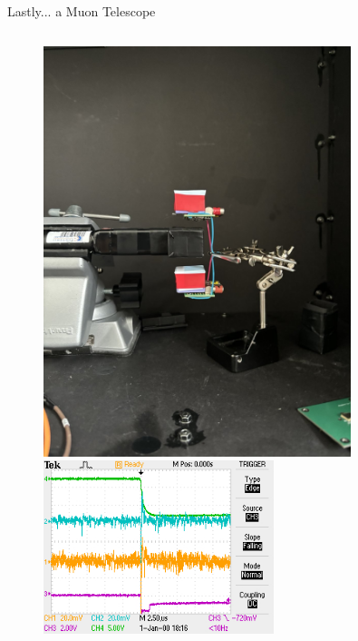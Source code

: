 \begin{columnframe}{Lastly... a Muon Telescope}
    \begin{column}{0.5\textwidth}
        \begin{figure}
            \centering
            \includegraphics[trim=0 500 0 500, clip, width=0.8\textwidth, frame]{images/muon_telescope_setup.jpg}
            \includegraphics[width=0.6\textwidth, frame]{images/muon_coincidence_screenshot.jpg}
        \end{figure}
    \end{column}
    \begin{column}{0.5\textwidth}
        \begin{figure}
            \centering

\end{figure}
\end{column}
\end{columnframe}
